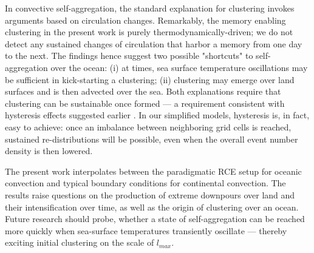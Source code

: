 \documentclass{article}
\begin{document}
In convective self-aggregation, the standard explanation for clustering invokes arguments based on circulation changes.
Remarkably, the memory enabling clustering in the present work is purely thermodynamically-driven; we do not detect any sustained changes of circulation that harbor a memory from one day to the next.
The findings hence suggest two possible "shortcuts" to self-aggregation over the ocean: 
(i) at times, sea surface temperature oscillations may be sufficient in kick-starting a clustering;
(ii) clustering may emerge over land surfaces and is then advected over the sea.
Both explanations require that clustering can be sustainable once formed --- a requirement consistent with hysteresis effects suggested earlier \cite{muller2015favors}.
In our simplified models, hysteresis is, in fact, easy to achieve: once an imbalance between neighboring grid cells is reached, sustained re-distributions will be possible, even when the overall event number density is then lowered.

The present work interpolates between the paradigmatic RCE setup for oceanic convection and typical boundary conditions for continental convection. 
The results raise questions on the production of extreme downpours over land and their intensification over time, as well as the origin of clustering over an ocean.
Future research should probe, whether a state of self-aggregation can be reached more quickly when sea-surface temperatures transiently oscillate --- thereby exciting initial clustering on the scale of $l_{max}$.
\end{document}
